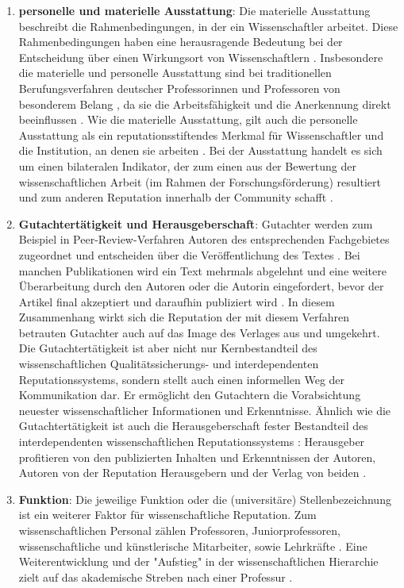 \begin{enumerate}
\item \textbf{personelle und materielle Ausstattung}: Die materielle Ausstattung beschreibt die Rahmenbedingungen, in der ein Wissenschaftler arbeitet. Diese Rahmenbedingungen haben eine herausragende Bedeutung bei der Entscheidung über einen Wirkungsort von Wissenschaftlern \cite{mayntz_2008_wissensproduktion}. Insbesondere die materielle und personelle Ausstattung sind bei traditionellen Berufungsverfahren deutscher Professorinnen und Professoren von besonderem Belang \cite{himpele_2011_job}, da sie die Arbeitsfähigkeit und die Anerkennung direkt beeinflussen \cite{suche}. Wie die materielle Ausstattung, gilt auch die personelle Ausstattung als ein reputationsstiftendes Merkmal für Wissenschaftler und die Institution, an denen sie arbeiten \cite{mayntz_2008_wissensproduktion}. Bei der Ausstattung handelt es sich um einen bilateralen Indikator, der zum einen aus der Bewertung der wissenschaftlichen Arbeit (im Rahmen der Forschungsförderung) resultiert \cite{Herb_vermessung_2008} und  zum anderen Reputation innerhalb der Community schafft \cite{mayntz_2008_wissensproduktion}.
\item \textbf{Gutachtertätigkeit und Herausgeberschaft}: Gutachter werden zum Beispiel in Peer-Review-Verfahren Autoren des entsprechenden Fachgebietes zugeordnet und entscheiden über die Veröffentlichung des Textes \cite{Frey_2005}. Bei manchen Publikationen wird ein Text mehrmals abgelehnt und eine weitere Überarbeitung durch den Autoren oder die Autorin eingefordert, bevor der Artikel final akzeptiert und daraufhin publiziert wird \cite{Frey_2005}. In diesem Zusammenhang wirkt sich die Reputation der mit diesem Verfahren betrauten Gutachter auch auf das Image des Verlages aus und umgekehrt. Die Gutachtertätigkeit ist aber nicht nur Kernbestandteil des wissenschaftlichen Qualitätssicherungs- und interdependenten Reputationssystems, sondern stellt auch einen informellen Weg der Kommunikation dar. Er ermöglicht den Gutachtern die Vorabsichtung neuester wissenschaftlicher Informationen und Erkenntnisse. Ähnlich wie die Gutachtertätigkeit ist auch die Herausgeberschaft fester Bestandteil des interdependenten wissenschaftlichen Reputationssystems \cite{Frey_2005}: Herausgeber profitieren von den publizierten Inhalten und Erkenntnissen der Autoren, Autoren von der Reputation Herausgebern und der Verlag von beiden \cite{suchen}.
\item \textbf{Funktion}: Die jeweilige Funktion oder die (universitäre) Stellenbezeichnung ist ein weiterer Faktor für wissenschaftliche Reputation. Zum wissenschaftlichen Personal zählen Professoren, Juniorprofessoren, wissenschaftliche und künstlerische Mitarbeiter, sowie Lehrkräfte \cite{erhardt_2011_hochschulen}. Eine Weiterentwicklung und der "Aufstieg" in der wissenschaftlichen Hierarchie zielt auf das akademische Streben nach einer Professur \cite{Klecha_2008}.

\end{enumerate}
